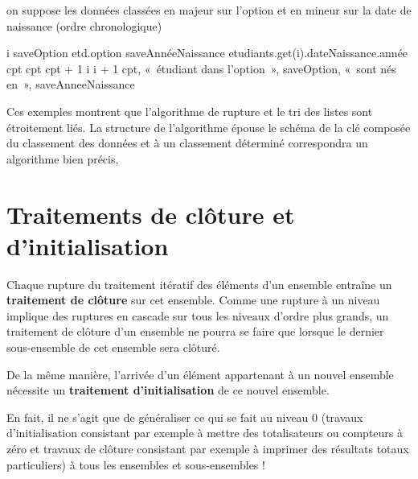 	\begin{LDA}
		\label{algo:rupt2}
			\LComment on suppose les données classées en majeur sur l’option
			\LComment et en mineur sur la date de naissance (ordre chronologique)
	
			\Let i 
				\Let saveOption \Gets etd.option
					\Let saveAnnéeNaissance \Gets etudiants.get(i).dateNaissance.année
					\Let cpt 
						\Let cpt \Gets cpt + 1
						\Let i \Gets i + 1		
					\EndWhile
					\Write cpt, «~étudiant dans l’option~», saveOption, 
					«~sont nés en~», saveAnneeNaissance
				\EndWhile
			\EndWhile
		\EndAlgo
	\end{LDA}

	Ces exemples montrent que l’algorithme de rupture 
	et le tri des listes sont étroitement liés. 
	La structure de l’algorithme épouse le schéma de la clé composée du classement des données
	et à un classement déterminé correspondra un algorithme bien précis, 

\section{Traitements de clôture et d’initialisation}

	Chaque rupture du traitement itératif des éléments d’un ensemble
	entraîne un \textbf{traitement de clôture} sur cet ensemble. Comme une
	rupture à un niveau implique des ruptures en cascade sur tous les
	niveaux d’ordre plus grands, un traitement de clôture d’un ensemble ne
	pourra se faire que lorsque le dernier sous-ensemble de cet ensemble
	sera clôturé.
	
	De la même manière, l’arrivée d’un élément appartenant à un nouvel
	ensemble nécessite un \textbf{traitement d’initialisation} de ce nouvel
	ensemble.
	
	En fait, il ne s’agit que de généraliser ce qui se fait au niveau 0 
	(travaux d’initialisation consistant par exemple à mettre des totalisateurs 
	ou compteurs à zéro et travaux de clôture consistant par exemple 
	à imprimer des résultats totaux particuliers) 
	à tous les ensembles et sous-ensembles !
